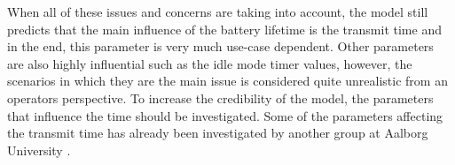When all of these issues and concerns are taking into account, the model still predicts that the main influence of the battery lifetime is the transmit time and in the end, this parameter is very much use-case dependent. Other parameters are also highly influential such as the idle mode timer values, however, the scenarios in which they are the main issue is considered quite unrealistic from an operators perspective. To increase the credibility of the model, the parameters that influence the time should be investigated. Some of the parameters affecting the transmit time has already been investigated by another group at Aalborg University \citep{NDS_report}.



